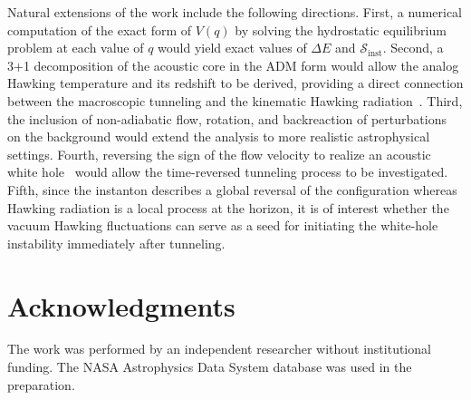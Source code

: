\documentclass[12pt,a4paper,preprint]{elsarticle}
\begin{document}
        Natural extensions of the work include the following directions. First, a numerical computation of the exact form of $V(q)$ by solving the hydrostatic equilibrium problem at each value of $q$ would yield exact values of $\Delta E$ and $\mathcal{S}_{\mathrm{inst}}$. Second, a 3+1 decomposition of the acoustic core in the ADM form would allow the analog Hawking temperature and its redshift to be derived, providing a direct connection between the macroscopic tunneling and the kinematic Hawking radiation~\cite{VolovikGE_PainleveGullstrandCoordinatesForSchwarzschildDeSitterSpacetime_2023}. Third, the inclusion of non-adiabatic flow, rotation, and backreaction of perturbations on the background would extend the analysis to more realistic astrophysical settings. Fourth, reversing the sign of the flow velocity to realize an acoustic white hole~\cite{SemyannikovAV_GlobalAcousticGeometryOfMichelFlowInPainleveGullstrandCoordinates_2026} would allow the time-reversed tunneling process to be investigated. Fifth, since the instanton describes a global reversal of the configuration whereas Hawking radiation is a local process at the horizon, it is of interest whether the vacuum Hawking fluctuations can serve as a seed for initiating the white-hole instability immediately after tunneling.

    \section*{Acknowledgments}
        The work was performed by an independent researcher without institutional funding. The NASA Astrophysics Data System database was used in the preparation.

    
    
\end{document}
